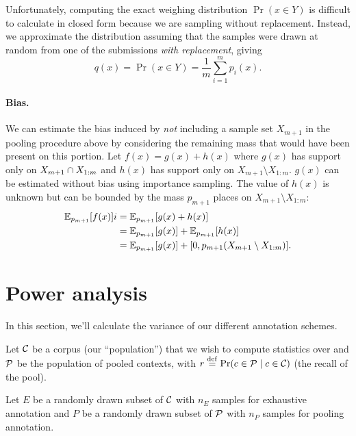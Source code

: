 Unfortunately, computing the exact weighing distribution $\Pr(x \in Y)$ is difficult to calculate in closed form because we are sampling without replacement.
Instead, we approximate the distribution assuming that the samples were drawn at random from one of the submissions \textit{with replacement}, giving 
\[
q(x) = \Pr(x \in Y) = \frac{1}{m}{\sum_{i=1}^m p_i(x)}.
\]

\paragraph{Bias.}

We can estimate the bias induced by \textit{not} including a sample set $X_{m+1}$ in the pooling procedure above by considering the remaining mass that would have been present on this portion.
Let $f(x) = g(x) + h(x)$ where $g(x)$ has support only on $X_{m+1} \cap X_{1:m}$ and $h(x)$ has support only on $X_{m+1} \setminus X_{1:m}$.
$g(x)$ can be estimated without bias using importance sampling.
The value of $h(x)$ is unknown but can be bounded by the mass $p_{m+1}$ places on $X_{m+1} \setminus X_{1:m}$:
\begin{align*}
\mathbb{E}_{p_{m+1}}[f(x)] i
  &= \mathbb{E}_{p_{m+1}}[g(x) + h(x)] \\
  &= \mathbb{E}_{p_{m+1}}[g(x)] + \mathbb{E}_{p_{m+1}}[h(x)] \\
  &= \mathbb{E}_{p_{m+1}}[g(x)] + [0, p_{m+1}(X_{m+1} \setminus X_{1:m})].
\end{align*}

\section{Power analysis}
\label{sec:power}

In this section, we'll calculate the variance of our different annotation schemes.

\newcommand{\xh}{\hat{x}}
\newcommand{\xb}{\bar{x}}
\newcommand{\yh}{\hat{y}}
\newcommand{\yb}{\bar{y}}
\newcommand{\rh}{\hat{r}}
\newcommand{\ph}{\hat{p}}

Let $\mathcal{C}$ be a corpus (our ``population'') that we wish to compute statistics over
and $\mathcal{P}$ be the population of pooled contexts, 
  with $r \stackrel{\rm def}{=} \Pr(c \in \mathcal{P} \mid c \in \mathcal{C})$ (the recall of the pool).

Let $E$ be a randomly drawn subset of $\mathcal{C}$ with $n_E$ samples for exhaustive annotation and
    $P$ be a randomly drawn subset of $\mathcal{P}$ with $n_P$ samples for pooling annotation.

